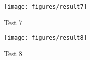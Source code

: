 \vspace{-0.5cm}
\begin{figure}[htp!]
	\begin{center}
		\texttt{[image: figures/result7]}
		\caption{Test 7}
		\label{fig:test7}
	\end{center}
\end{figure}

\vspace{-0.5cm}
\begin{figure}[htp!]
	\begin{center}
		\texttt{[image: figures/result8]}
		\caption{Test 8}
		\label{fig:test8}
	\end{center}
\end{figure}

\newpage